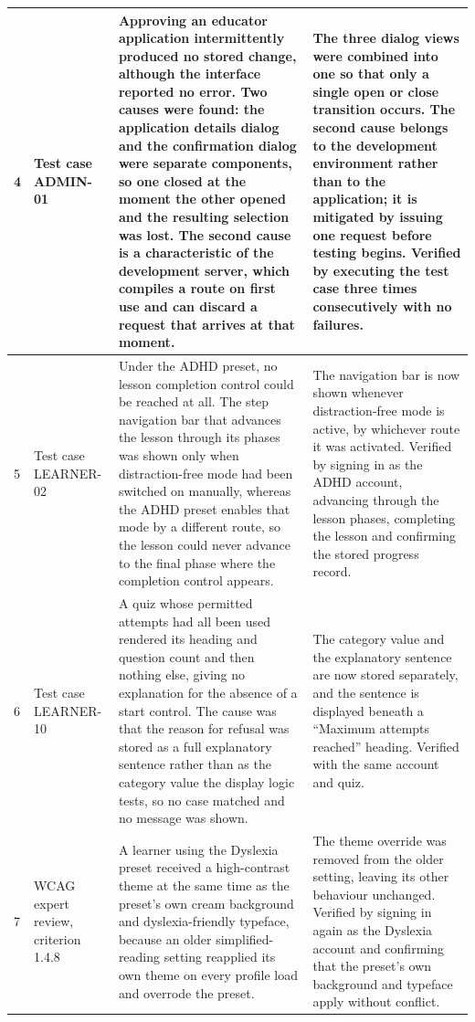 \documentclass[12pt, oneside]{article} %
\newcommand{\tabbreak}{\hyphenpenalty=200\exhyphenpenalty=200\tolerance=4000\hbadness=10000\hspace{0pt}}
\begin{document}
{\begin{longtable}{|>{\raggedright\arraybackslash\tabbreak}p{0.8cm}|>{\raggedright\arraybackslash\tabbreak}p{2.2cm}|>{\raggedright\arraybackslash\tabbreak}p{4.5cm}|>{\raggedright\arraybackslash\tabbreak}p{5.65cm}|}
4 & Test case ADMIN-01 & Approving an educator application intermittently produced no stored change, although the interface reported no error. Two causes were found: the application details dialog and the confirmation dialog were separate components, so one closed at the moment the other opened and the resulting selection was lost. The second cause is a characteristic of the development server, which compiles a route on first use and can discard a request that arrives at that moment. & The three dialog views were combined into one so that only a single open or close transition occurs. The second cause belongs to the development environment rather than to the application; it is mitigated by issuing one request before testing begins. Verified by executing the test case three times consecutively with no failures. \\ \hline
5 & Test case LEARNER-02 & Under the ADHD preset, no lesson completion control could be reached at all. The step navigation bar that advances the lesson through its phases was shown only when distraction-free mode had been switched on manually, whereas the ADHD preset enables that mode by a different route, so the lesson could never advance to the final phase where the completion control appears. & The navigation bar is now shown whenever distraction-free mode is active, by whichever route it was activated. Verified by signing in as the ADHD account, advancing through the lesson phases, completing the lesson and confirming the stored progress record. \\ \hline
6 & Test case LEARNER-10 & A quiz whose permitted attempts had all been used rendered its heading and question count and then nothing else, giving no explanation for the absence of a start control. The cause was that the reason for refusal was stored as a full explanatory sentence rather than as the category value the display logic tests, so no case matched and no message was shown. & The category value and the explanatory sentence are now stored separately, and the sentence is displayed beneath a ``Maximum attempts reached'' heading. Verified with the same account and quiz. \\ \hline
7 & WCAG expert review, criterion 1.4.8 & A learner using the Dyslexia preset received a high-contrast theme at the same time as the preset's own cream background and dyslexia-friendly typeface, because an older simplified-reading setting reapplied its own theme on every profile load and overrode the preset. & The theme override was removed from the older setting, leaving its other behaviour unchanged. Verified by signing in again as the Dyslexia account and confirming that the preset's own background and typeface apply without conflict. \\ \hline
\end{longtable}
}
\end{document}

